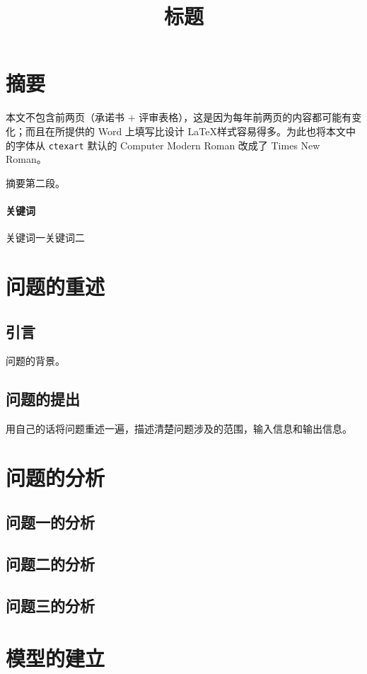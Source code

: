 \documentclass{ctexart}
\begin{document}
\pagestyle{plain}
\title{标题}
\author{}
\date{}
\maketitle
\section*{摘要}

本文不包含前两页（承诺书 + 评审表格），这是因为每年前两页的内容都可能有变化；而且在所提供的 Word 上填写比设计 \LaTeX 样式容易得多\cite{someitem}。为此也将本文中的字体从 \verb|ctexart| 默认的 Computer Modern Roman 改成了 Times New Roman。

摘要第二段。

\paragraph*{关键词} 关键词一\quad 关键词二
\newpage
\section{问题的重述}
\subsection{引言}
问题的背景。
\subsection{问题的提出}
用自己的话将问题重述一遍，描述清楚问题涉及的范围，输入信息和输出信息。
\newpage
\section{问题的分析}
\subsection{问题一的分析}
\subsection{问题二的分析}
\subsection{问题三的分析}
\newpage
\section{模型的建立}
\end{document}
